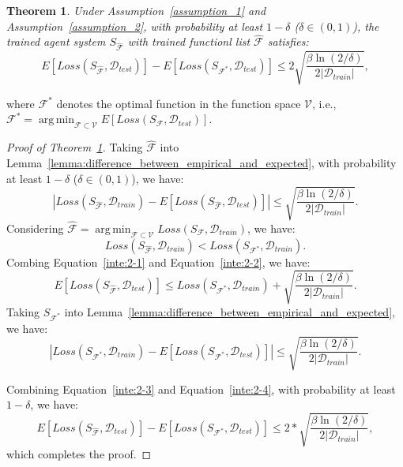 \documentclass{article}
\theoremstyle{plain}
\newtheorem{theorem}{Theorem}[section]
\theoremstyle{definition}
\theoremstyle{remark}
\DeclareMathOperator*{\argmin}{arg\,min}
\begin{document}
\begin{theorem}\label{theorem:diff_expfunc_optimalfunc}
Under Assumption~\ref{assumption_1} and Assumption~\ref{assumption_2}, with probability at least \(1-\delta\) (\(\delta \in (0,1)\)), the trained agent system $S_{\mathcal{\hat{F}}}$ with trained functionl list $\mathcal{\hat{F}}$ satisfies:
\begin{equation}
E[Loss(S_{\mathcal{\hat{F}}}, \mathcal{D}_{test})] - E[Loss(S_{\mathcal{F^*}}, \mathcal{D}_{test})] \leq 2\sqrt{\frac{\beta \ln (2/\delta) }{2|\mathcal{D}_{train}|}},
\end{equation}
\end{theorem}
where $\mathcal{F^*}$ denotes the optimal function in the function space $\mathcal{V}$, i.e., $\mathcal{F^{*}} = \argmin_{\mathcal{F}\subset\mathcal{V}}E[Loss(S_{\mathcal{F}}, \mathcal{D}_{test})]$.

\begin{proof}[Proof of Theorem~\ref{theorem:diff_expfunc_optimalfunc}]

Taking $\mathcal{\hat{F}}$ into Lemma~\ref{lemma:difference_between_empirical_and_expected}, with probability at least \(1-\delta\) (\(\delta \in (0,1)\)), we have:
\begin{equation} \label{inte:2-1}
|Loss(S_{\mathcal{\hat{F}}}, \mathcal{D}_{train}) - E[Loss(S_{\mathcal{\hat{F}}}, \mathcal{D}_{test})]| \leq \sqrt{\frac{\beta \ln (2/\delta) }{2|\mathcal{D}_{train}|}}.
\end{equation}
Considering $\hat{\mathcal{F}} = \argmin_{\mathcal{F}\subset\mathcal{V}}Loss(S_{\mathcal{F}}, \mathcal{D}_{train})$, we have:
\begin{equation} \label{inte:2-2}
Loss(S_{\mathcal{\hat{F}}}, \mathcal{D}_{train}) < Loss(S_{\mathcal{F^*}}, \mathcal{D}_{train}).
\end{equation}
Combing Equation~\ref{inte:2-1} and Equation~\ref{inte:2-2}, we have:
\begin{equation} \label{inte:2-3}
E[Loss(S_{\mathcal{\hat{F}}}, \mathcal{D}_{test})]  \leq Loss(S_{\mathcal{F^*}}, \mathcal{D}_{train}) + \sqrt{\frac{\beta \ln (2/\delta) }{2|\mathcal{D}_{train}|}}.
\end{equation}
Taking $S_{\mathcal{F^*}}$ into Lemma~\ref{lemma:difference_between_empirical_and_expected}, we have:
\begin{equation}\label{inte:2-4}
|Loss(S_{\mathcal{F^*}}, \mathcal{D}_{train}) -E[Loss(S_{\mathcal{F^*}}, \mathcal{D}_{test})] | \leq     \sqrt{\frac{\beta \ln (2/\delta) }{2|\mathcal{D}_{train}|}}.
\end{equation}

Combining Equation~\ref{inte:2-3} and Equation~\ref{inte:2-4}, with probability at least $1-\delta$, we have:
\begin{equation} \label{inte:2-4}
E[Loss(S_{\mathcal{\hat{F}}}, \mathcal{D}_{test})] - E[Loss(S_{\mathcal{F^*}}, \mathcal{D}_{test})] \leq 2*\sqrt{\frac{\beta \ln (2/\delta) }{2|\mathcal{D}_{train}|}},
\end{equation}
which completes the proof.
\end{proof}
\end{document}
